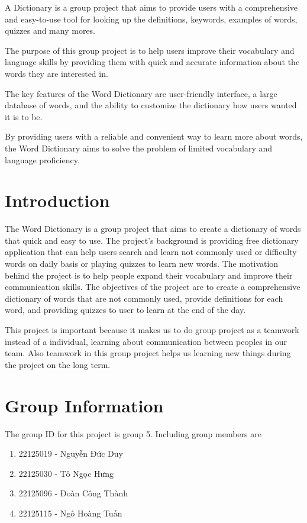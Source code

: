 \documentclass[sn-mathphys,Numbered]{sn-jnl}%
\begin{document}
A Dictionary is a group project that aims to provide users with a comprehensive and easy-to-use tool for looking up the definitions, keywords, examples of words, quizzes and many mores.

The purpose of this group project is to help users improve their vocabulary and language skills by providing them with quick and accurate information about the words they are interested in.

The key features of the Word Dictionary are user-friendly interface, a large database of words, and the ability to customize the dictionary how users wanted it is to be.

By providing users with a reliable and convenient way to learn more about words, the Word Dictionary aims to solve the problem of limited vocabulary and language proficiency.

\section{Introduction}

The Word Dictionary is a group project that aims to create a dictionary of words that quick and easy to use. The project’s background is providing free dictionary application that can help users search and learn not commonly used or difficulty words on daily basis or playing quizzes to learn new words. The motivation behind the project is to help people expand their vocabulary and improve their communication skills. The objectives of the project are to create a comprehensive dictionary of words that are not commonly used, provide definitions for each word, and providing quizzes to user to learn at the end of the day.

This project is important because it makes us to do group project as a teamwork instead of a individual, learning about communication between peoples in our team. Also teamwork in this group project helps us learning new things during the project on the long term.

\section{Group Information}

The group ID for this project is group 5. Including group members are

\begin{enumerate}
	\item 22125019 - \foreignlanguage{vietnamese}{Nguyễn Đức Duy}
	
	\item 22125030 - \foreignlanguage{vietnamese}{Tô Ngọc Hưng}
	
	\item 22125096 - \foreignlanguage{vietnamese}{Đoàn Công Thành}
	
	\item 22125115 - \foreignlanguage{vietnamese}{Ngô Hoàng Tuấn}
\end{enumerate}
 
\end{document}
